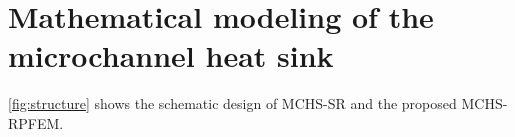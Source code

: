 %
% 
%

\section{Mathematical modeling of the microchannel heat sink}

\cref{fig:structure} shows the schematic design of MCHS-SR and the proposed MCHS-RPFEM.


